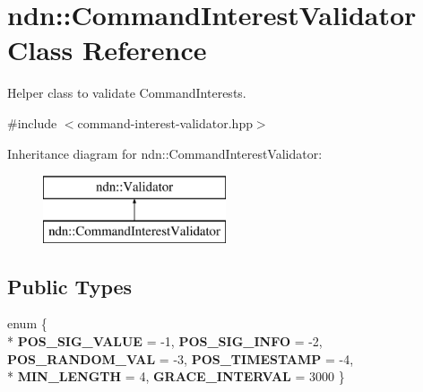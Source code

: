 \hypertarget{classndn_1_1CommandInterestValidator}{}\section{ndn\+:\+:Command\+Interest\+Validator Class Reference}
\label{classndn_1_1CommandInterestValidator}


Helper class to validate Command\+Interests.  




{\ttfamily \#include $<$command-\/interest-\/validator.\+hpp$>$}

Inheritance diagram for ndn\+:\+:Command\+Interest\+Validator\+:\begin{figure}[H]
\begin{center}
\leavevmode
\includegraphics[height=2.000000cm]{classndn_1_1CommandInterestValidator}
\end{center}
\end{figure}
\subsection*{Public Types}
\begin{DoxyCompactItemize}
\item 
enum \{ \\*
{\bfseries P\+O\+S\+\_\+\+S\+I\+G\+\_\+\+V\+A\+L\+UE} = -\/1, 
{\bfseries P\+O\+S\+\_\+\+S\+I\+G\+\_\+\+I\+N\+FO} = -\/2, 
{\bfseries P\+O\+S\+\_\+\+R\+A\+N\+D\+O\+M\+\_\+\+V\+AL} = -\/3, 
{\bfseries P\+O\+S\+\_\+\+T\+I\+M\+E\+S\+T\+A\+MP} = -\/4, 
\\*
{\bfseries M\+I\+N\+\_\+\+L\+E\+N\+G\+TH} = 4, 
{\bfseries G\+R\+A\+C\+E\+\_\+\+I\+N\+T\+E\+R\+V\+AL} = 3000
 \}\hypertarget{classndn_1_1CommandInterestValidator_a27e42de9c54afd20665a3b065bc0ac7b}{}\label{classndn_1_1CommandInterestValidator_a27e42de9c54afd20665a3b065bc0ac7b}

\end{DoxyCompactItemize}
